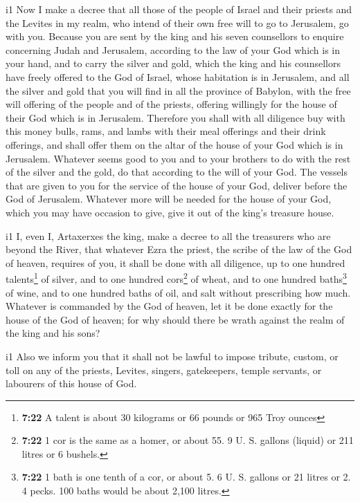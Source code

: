 i1 Now  I make a decree that all those of the people of
Israel and their priests and the Levites in my realm, who intend of
their own free will to go to Jerusalem, go with you. 
Because you are sent by the king and his seven counsellors to enquire
concerning Judah and Jerusalem, according to the law of your God which
is in your hand,  and to carry the silver and gold, which
the king and his counsellors have freely offered to the God of Israel,
whose habitation is in Jerusalem,  and all the silver and
gold that you will find in all the province of Babylon, with the free
will offering of the people and of the priests, offering willingly for
the house of their God which is in Jerusalem.  Therefore
you shall with all diligence buy with this money bulls, rams, and lambs
with their meal offerings and their drink offerings, and shall offer
them on the altar of the house of your God which is in Jerusalem.
 Whatever seems good to you and to your brothers to do
with the rest of the silver and the gold, do that according to the will
of your God.  The vessels that are given to you for the
service of the house of your God, deliver before the God of Jerusalem.
 Whatever more will be needed for the house of your God,
which you may have occasion to give, give it out of the king's treasure
house.

i1 I, even I, Artaxerxes the king, make a decree to all
the treasurers who are beyond the River, that whatever Ezra the priest,
the scribe of the law of the God of heaven, requires of you, it shall be
done with all diligence,  up to one hundred
talents\footnote{\textbf{7:22} A talent is about 30 kilograms or 66
  pounds or 965 Troy ounces} of silver, and to one hundred
cors\footnote{\textbf{7:22} 1 cor is the same as a homer, or about 55. 9
  U. S. gallons (liquid) or 211 litres or 6 bushels.} of wheat, and to
one hundred baths\footnote{\textbf{7:22} 1 bath is one tenth of a cor,
  or about 5. 6 U. S. gallons or 21 litres or 2. 4 pecks. 100 baths
  would be about 2,100 litres.} of wine, and to one hundred baths of
oil, and salt without prescribing how much.  Whatever is
commanded by the God of heaven, let it be done exactly for the house of
the God of heaven; for why should there be wrath against the realm of
the king and his sons?

i1 Also we inform you that it shall not be lawful to
impose tribute, custom, or toll on any of the priests, Levites, singers,
gatekeepers, temple servants, or labourers of this house of God.

